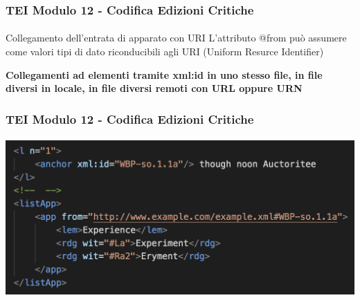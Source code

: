 \begin{frame}
    \frametitle{TEI Modulo 12 - Codifica Edizioni Critiche}
    \framesubtitle{}
    \addtocounter{nframe}{1}
    



    \begin{block}{Collegamento dell'entrata di apparato con URI}
       L'attributo @from può assumere come valori tipi di dato riconducibili agli URI (Uniform Resurce Identifier)
    \end{block}
    \textbf{Collegamenti ad elementi tramite xml:id in uno stesso file, in file diversi in locale, in file diversi remoti con URL oppure URN}

\end{frame}



\begin{frame}
    \frametitle{TEI Modulo 12 - Codifica Edizioni Critiche}
    \framesubtitle{}
    \addtocounter{nframe}{1}
    


    \begin{center}
       \includegraphics[width=.95\textwidth]{imgs/app-uri-png.png}
    \end{center}
   
\end{frame}



